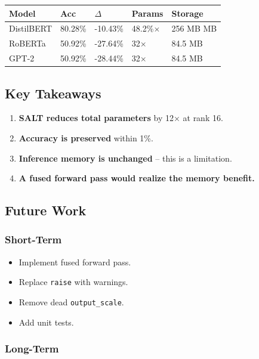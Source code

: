 \begin{table}[H]
\centering
\small
\begin{tabular}{lllll}
\toprule
\textbf{Model} & \textbf{Acc} & \textbf{$\Delta$} & \textbf{Params} & \textbf{Storage} \\
\midrule
DistilBERT & 80.28\% & -10.43\% & 48.2\%$\times$ & 256 MB MB \\
RoBERTa & 50.92\% & -27.64\% & 32$\times$ & 84.5 MB \\
GPT-2 & 50.92\% & -28.44\% & 32$\times$ & 84.5 MB \\
\bottomrule
\end{tabular}
\end{table}

\subsection{Key Takeaways}

\begin{enumerate}
\item \textbf{SALT reduces total parameters} by 12$\times$ at rank 16.
\item \textbf{Accuracy is preserved} within 1\%.
\item \textbf{Inference memory is unchanged} -- this is a limitation.
\item \textbf{A fused forward pass would realize the memory benefit.}

\end{enumerate}
\subsection{Future Work}

\subsubsection{Short-Term}

\begin{itemize}
\item Implement fused forward pass.
\item Replace \texttt{raise} with warnings.
\item Remove dead \texttt{output\_scale}.
\item Add unit tests.

\end{itemize}
\subsubsection{Long-Term}

